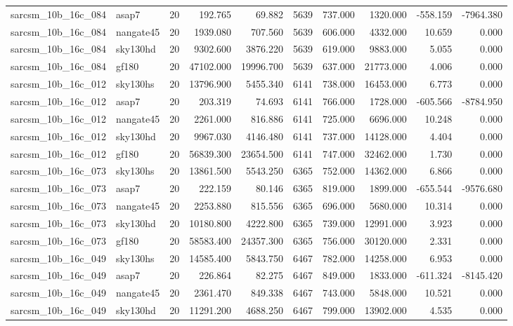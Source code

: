 \begin{tabular}{llrrrrrrrr}
sarcsm\_10b\_16c\_084 & asap7 & 20 & 192.765 & 69.882 & 5639 & 737.000 & 1320.000 & -558.159 & -7964.380 \\
sarcsm\_10b\_16c\_084 & nangate45 & 20 & 1939.080 & 707.560 & 5639 & 606.000 & 4332.000 & 10.659 & 0.000 \\
sarcsm\_10b\_16c\_084 & sky130hd & 20 & 9302.600 & 3876.220 & 5639 & 619.000 & 9883.000 & 5.055 & 0.000 \\
sarcsm\_10b\_16c\_084 & gf180 & 20 & 47102.000 & 19996.700 & 5639 & 637.000 & 21773.000 & 4.006 & 0.000 \\
sarcsm\_10b\_16c\_012 & sky130hs & 20 & 13796.900 & 5455.340 & 6141 & 738.000 & 16453.000 & 6.773 & 0.000 \\
sarcsm\_10b\_16c\_012 & asap7 & 20 & 203.319 & 74.693 & 6141 & 766.000 & 1728.000 & -605.566 & -8784.950 \\
sarcsm\_10b\_16c\_012 & nangate45 & 20 & 2261.000 & 816.886 & 6141 & 725.000 & 6696.000 & 10.248 & 0.000 \\
sarcsm\_10b\_16c\_012 & sky130hd & 20 & 9967.030 & 4146.480 & 6141 & 737.000 & 14128.000 & 4.404 & 0.000 \\
sarcsm\_10b\_16c\_012 & gf180 & 20 & 56839.300 & 23654.500 & 6141 & 747.000 & 32462.000 & 1.730 & 0.000 \\
sarcsm\_10b\_16c\_073 & sky130hs & 20 & 13861.500 & 5543.250 & 6365 & 752.000 & 14362.000 & 6.866 & 0.000 \\
sarcsm\_10b\_16c\_073 & asap7 & 20 & 222.159 & 80.146 & 6365 & 819.000 & 1899.000 & -655.544 & -9576.680 \\
sarcsm\_10b\_16c\_073 & nangate45 & 20 & 2253.880 & 815.556 & 6365 & 696.000 & 5680.000 & 10.314 & 0.000 \\
sarcsm\_10b\_16c\_073 & sky130hd & 20 & 10180.800 & 4222.800 & 6365 & 739.000 & 12991.000 & 3.923 & 0.000 \\
sarcsm\_10b\_16c\_073 & gf180 & 20 & 58583.400 & 24357.300 & 6365 & 756.000 & 30120.000 & 2.331 & 0.000 \\
sarcsm\_10b\_16c\_049 & sky130hs & 20 & 14585.400 & 5843.750 & 6467 & 782.000 & 14258.000 & 6.953 & 0.000 \\
sarcsm\_10b\_16c\_049 & asap7 & 20 & 226.864 & 82.275 & 6467 & 849.000 & 1833.000 & -611.324 & -8145.420 \\
sarcsm\_10b\_16c\_049 & nangate45 & 20 & 2361.470 & 849.338 & 6467 & 743.000 & 5848.000 & 10.521 & 0.000 \\
sarcsm\_10b\_16c\_049 & sky130hd & 20 & 11291.200 & 4688.250 & 6467 & 799.000 & 13902.000 & 4.535 & 0.000 \\

\end{tabular}
